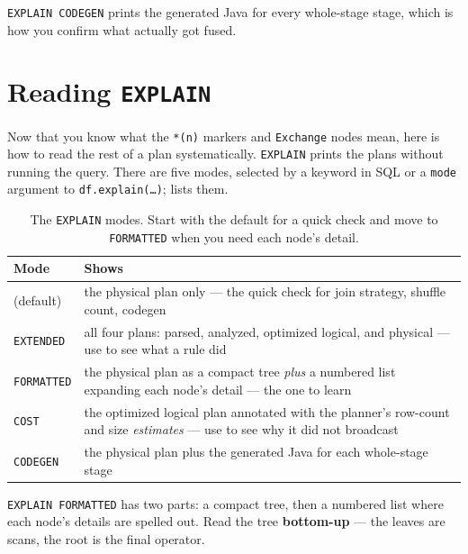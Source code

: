 \texttt{EXPLAIN CODEGEN} prints the generated Java for every whole-stage stage,
which is how you confirm what actually got fused.

\section{Reading \texttt{EXPLAIN}}
\label{sec:catalyst-explain}

Now that you know what the \texttt{*(n)} markers and \texttt{Exchange} nodes
mean, here is how to read the rest of a plan systematically.
\texttt{EXPLAIN} prints the plans without running the query. There are five modes,
selected by a keyword in SQL or a \texttt{mode} argument to
\texttt{df.explain(\ldots)};  lists them.

\begin{table}[htbp]
\centering\footnotesize
\renewcommand{\arraystretch}{1.15}
\begin{tabular}{@{}P{2.7cm}P{11.2cm}@{}}
\toprule
\textbf{Mode} & \textbf{Shows} \\
\midrule
(default) & the physical plan only --- the quick check for join strategy, shuffle count, codegen \\
\texttt{EXTENDED} & all four plans: parsed, analyzed, optimized logical, and physical --- use to see what a rule did \\
\texttt{FORMATTED} & the physical plan as a compact tree \emph{plus} a numbered list expanding each node's detail --- the one to learn \\
\texttt{COST} & the optimized logical plan annotated with the planner's row-count and size \emph{estimates} --- use to see why it did not broadcast \\
\texttt{CODEGEN} & the physical plan plus the generated Java for each whole-stage stage \\
\bottomrule
\end{tabular}
\caption{The \texttt{EXPLAIN} modes. Start with the default for a quick check and
move to \texttt{FORMATTED} when you need each node's detail.}
\label{tab:catalyst-explain-modes}
\end{table}

\texttt{EXPLAIN FORMATTED} has two parts: a compact tree, then a numbered list
where each node's details are spelled out. Read the tree \textbf{bottom-up} ---
the leaves are scans, the root is the final operator.

